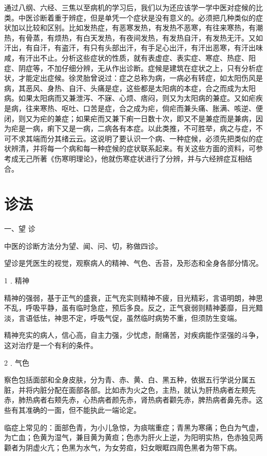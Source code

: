 \documentclass[12pt,UTF8]{ctexbook}
\begin{document}
通过八纲、六经、三焦以至病机的学习后，我们以为还应该学一学中医对症候的比类。中医诊断着重于辨症，但是单凭一个症状是没有意义的。必须把几种类似的症状加以比较和区别。比如发热症，有恶寒发热，有发热不恶寒，有往来寒热，有潮热，有骨蒸，有烦热，有白天发热，有夜间发热，有发热自汗，有发热无汗。又如汗出，有自汗，有盗汗，有只有头部出汗，有手足心出汗，有汗出恶寒，有汗出味咸，有汗出不止。分析这些症状的性质，就有表虚症、表实症、寒症、热症、阳症、阴症等，不加仔细分辨，无从作出诊断。症候是建筑在症状之上，只有分析症状，才能定出症候。徐灵胎曾说过：症之总称为病，一病必有转症，如太阳伤风是病，其恶风、身热、自汗、头痛是症，这些都是太阳病的本症，合之而成为太阳病。如果太阳病而又兼泄泻、不寐、心烦、痞闷，则又为太阳病的兼症。又如疟疾是病，往来寒热、呕吐、口苦是症，合之成为疟，倘疟而兼头痛、胀满、咳逆、便闭，则又为疟的兼症；如果疟而又兼下痢一日数十次，即又不是兼症而是兼病，因为疟是一病，痢下又是一病，二病各有本症。以此类推，不可胜举，病之与症，不可不求其端而分其绪云云。这说明了要认识一个病、一种症候，必须先把类似的症状辨清，并将每一个病和每一种症候的症状联系起来。有关这些方面的资料，可参考成无己所著《伤寒明理论》，他就伤寒症状进行了分辨，并与六经辨症互相结合。

\section{诊法}

一、望 诊

中医的诊断方法分为望、闻、问、切，称做四诊。

望诊是凭医生的视觉，观察病人的精神、气色、舌苔，及形态和全身各部分情况。

1﹒精神

精神的强弱，基于正气的盛衰，正气充实则精神不疲，目光精彩，言语明朗，神思不乱，呼吸平静，虽有临时急症，预后多良。反之，正气衰弱则精神萎靡，目光黯淡，言语低怯，神思不定，呼吸气促，虽然临时病势不重，但须防生变端。

精神充实的病人，信心高，自主力强，少忧虑，耐痛苦，对疾病能作坚强的斗争，这对治疗是一个有利的条件。

2﹒气色

察色包括面部和全身皮肤，分为青、赤、黄、白、黑五种，依据五行学说分属五脏，并将内脏分配在面部各部。比如赤为火之色，主热，就认为肝热病者左颊先赤，肺热病者右颊先赤，心热病者颜先赤，肾热病者颧先赤，脾热病者鼻先赤。这些有其准确的一面，但不能执此一端论定。

临症上常见的：面部色青，为小儿急惊，为痰喘重症；青黑为寒痛；色白为气虚，为亡血；色黄为湿气，兼目黄为黄疸；色赤为肝火上逆，为阳明实热，色赤独见两颧者为阴虚火亢；色黑为水气，为女劳疸，妇女眼眶四周色黑者为带下病。
\end{document}
